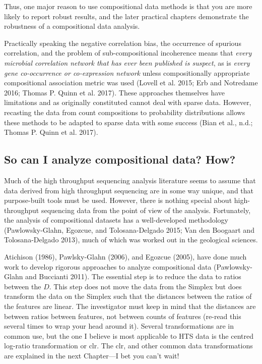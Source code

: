 \documentclass[onecolumn]{article}
\begin{document}
Thus, one major reason to use compositional data methods is that you are more likely to report robust results, and the later practical chapters demonstrate the robustness of a compositional data analysis.

Practically speaking the negative correlation bias, the occurrence of spurious correlation, and the problem of sub-compositional incoherence means that \emph{every microbial correlation network that has ever been published is suspect}, as is \emph{every gene co-occurrence or co-expression network} unless compositionally appropriate compositional association metric was used (Lovell et al. 2015; Erb and Notredame 2016; Thomas P. Quinn et al. 2017). These approaches themselves have limitations and as originally constituted cannot deal with sparse data. However, recasting the data from count compositions to probability distributions allows these methods to be adapted to sparse data with some success (Bian et al., n.d.; Thomas P. Quinn et al. 2017).

\hypertarget{so-can-i-analyze-compositional-data-how}{%
\subsection{So can I analyze compositional data? How?}\label{so-can-i-analyze-compositional-data-how}}

Much of the high throughput sequencing analysis literature seems to assume that data derived from high throughput sequencing are in some way unique, and that purpose-built tools must be used. However, there is nothing special about high-throughput sequencing data from the point of view of the analysis. Fortunately, the analysis of compositional datasets has a well-developed methodology (Pawlowsky-Glahn, Egozcue, and Tolosana-Delgado 2015; Van den Boogaart and Tolosana-Delgado 2013), much of which was worked out in the geological sciences.

Atichison (1986), Pawlsky-Glahn (2006), and Egozcue (2005), have done much work to develop rigorous approaches to analyze compositional data (Pawlowsky-Glahn and Buccianti 2011). The essential step is to reduce the data to ratios between the \(D\). This step does not move the data from the Simplex but does transform the data on the Simplex such that the distances between the ratios of the features are linear. The investigator must keep in mind that the distances are between ratios between features, not between counts of features (re-read this several times to wrap your head around it). Several transformations are in common use, but the one I believe is most applicable to HTS data is the centred log-ratio transformation or clr. The clr, and other common data transformations are explained in the next Chapter---I bet you can't wait!
\end{document}

